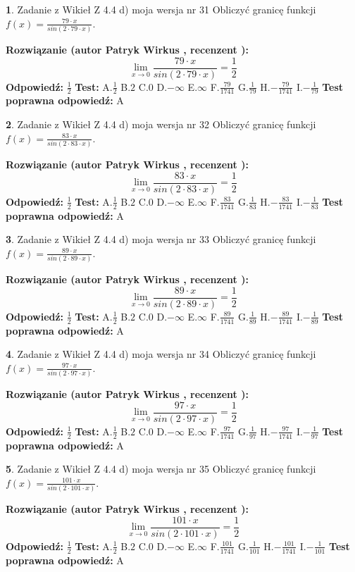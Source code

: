 \documentclass[12pt, a4paper]{article}
\theoremstyle{definition} %
\newtheorem{zad}{}
\newcommand{\zadStart}[1]{\begin{zad}#1\newline}
\newcommand{\zadStop}{\end{zad}}
\newcommand{\rozwStart}[2]{\noindent \textbf{Rozwiązanie (autor #1 , recenzent #2): }\newline}
\newcommand{\rozwStop}{\newline}
\newcommand{\odpStart}{\noindent \textbf{Odpowiedź:}\newline}
\newcommand{\odpStop}{\newline}
\newcommand{\testStart}{\noindent \textbf{Test:}\newline}
\newcommand{\testStop}{\newline}
\newcommand{\kluczStart}{\noindent \textbf{Test poprawna odpowiedź:}\newline}
\newcommand{\kluczStop}{\newline}
\begin{document}
\zadStart{Zadanie z Wikieł Z 4.4 d) moja wersja nr 31}
Obliczyć granicę funkcji $f(x)=\frac{79\cdot x}{sin(2 \cdot79\cdot x)}$.
\zadStop
\rozwStart{Patryk Wirkus}{}
$$\lim\limits_{x\to 0}\frac{79\cdot x}{sin(2 \cdot79\cdot x)}=\frac{1}{2}$$
\rozwStop
\odpStart
$\frac{1}{2}$
\odpStop
\testStart
A.$\frac{1}{2}$
B.$2$
C.$0$
D.$-\infty$
E.$\infty$
F.$\frac{79}{1741}$
G.$\frac{1}{79}$
H.$-\frac{79}{1741}$
I.$-\frac{1}{79}$
\testStop
\kluczStart
A
\kluczStop



\zadStart{Zadanie z Wikieł Z 4.4 d) moja wersja nr 32}
Obliczyć granicę funkcji $f(x)=\frac{83\cdot x}{sin(2 \cdot83\cdot x)}$.
\zadStop
\rozwStart{Patryk Wirkus}{}
$$\lim\limits_{x\to 0}\frac{83\cdot x}{sin(2 \cdot83\cdot x)}=\frac{1}{2}$$
\rozwStop
\odpStart
$\frac{1}{2}$
\odpStop
\testStart
A.$\frac{1}{2}$
B.$2$
C.$0$
D.$-\infty$
E.$\infty$
F.$\frac{83}{1741}$
G.$\frac{1}{83}$
H.$-\frac{83}{1741}$
I.$-\frac{1}{83}$
\testStop
\kluczStart
A
\kluczStop



\zadStart{Zadanie z Wikieł Z 4.4 d) moja wersja nr 33}
Obliczyć granicę funkcji $f(x)=\frac{89\cdot x}{sin(2 \cdot89\cdot x)}$.
\zadStop
\rozwStart{Patryk Wirkus}{}
$$\lim\limits_{x\to 0}\frac{89\cdot x}{sin(2 \cdot89\cdot x)}=\frac{1}{2}$$
\rozwStop
\odpStart
$\frac{1}{2}$
\odpStop
\testStart
A.$\frac{1}{2}$
B.$2$
C.$0$
D.$-\infty$
E.$\infty$
F.$\frac{89}{1741}$
G.$\frac{1}{89}$
H.$-\frac{89}{1741}$
I.$-\frac{1}{89}$
\testStop
\kluczStart
A
\kluczStop



\zadStart{Zadanie z Wikieł Z 4.4 d) moja wersja nr 34}
Obliczyć granicę funkcji $f(x)=\frac{97\cdot x}{sin(2 \cdot97\cdot x)}$.
\zadStop
\rozwStart{Patryk Wirkus}{}
$$\lim\limits_{x\to 0}\frac{97\cdot x}{sin(2 \cdot97\cdot x)}=\frac{1}{2}$$
\rozwStop
\odpStart
$\frac{1}{2}$
\odpStop
\testStart
A.$\frac{1}{2}$
B.$2$
C.$0$
D.$-\infty$
E.$\infty$
F.$\frac{97}{1741}$
G.$\frac{1}{97}$
H.$-\frac{97}{1741}$
I.$-\frac{1}{97}$
\testStop
\kluczStart
A
\kluczStop



\zadStart{Zadanie z Wikieł Z 4.4 d) moja wersja nr 35}
Obliczyć granicę funkcji $f(x)=\frac{101\cdot x}{sin(2 \cdot101\cdot x)}$.
\zadStop
\rozwStart{Patryk Wirkus}{}
$$\lim\limits_{x\to 0}\frac{101\cdot x}{sin(2 \cdot101\cdot x)}=\frac{1}{2}$$
\rozwStop
\odpStart
$\frac{1}{2}$
\odpStop
\testStart
A.$\frac{1}{2}$
B.$2$
C.$0$
D.$-\infty$
E.$\infty$
F.$\frac{101}{1741}$
G.$\frac{1}{101}$
H.$-\frac{101}{1741}$
I.$-\frac{1}{101}$
\testStop
\kluczStart
A
\kluczStop
\end{document}
